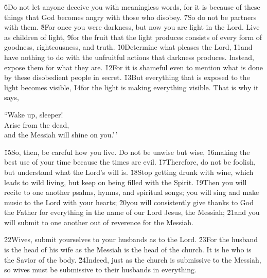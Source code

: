 \v{6}Do not let anyone deceive you with meaningless words, for it is because of these things that God becomes angry with those who disobey. \v{7}So do not be partners with them. \v{8}For once you were darkness, but now you are light in the Lord. Live as children of light, \v{9}for the fruit that the light produces consists of every form of goodness, righteousness, and truth. \v{10}Determine what pleases the Lord, \v{11}and have nothing to do with the unfruitful actions that darkness produces. Instead, expose them for what they are. \v{12}For it is shameful even to mention what is done by these disobedient people in secret. \v{13}But everything that is exposed to the light becomes visible, \v{14}for the light is making everything visible. That is why it says,

\begin{poetry}
\poeml ``Wake up, sleeper! \\
\poemll    Arise from the dead, \\
\poemlll       and the Messiah will shine on you.'\,'
\end{poetry}

\v{15}So, then, be careful how you live. Do not be unwise but wise, \v{16}making the best use of your time because the times are evil. \v{17}Therefore, do not be foolish, but understand what the Lord's will is. \v{18}Stop getting drunk with wine, which leads to wild living, but keep on being filled with the Spirit. \v{19}Then you will recite to one another psalms, hymns, and spiritual songs; you will sing and make music to the Lord with your hearts; \v{20}you will consistently give thanks to God the Father for everything in the name of our Lord Jesus, the Messiah; \v{21}and you will submit to one another out of reverence for the Messiah.

\v{22}Wives, submit yourselves to your husbands as to the Lord. \v{23}For the husband is the head of his wife as the Messiah is the head of the church. It is he who is the Savior of the body. \v{24}Indeed, just as the church is submissive to the Messiah, so wives must be submissive to their husbands in everything.

